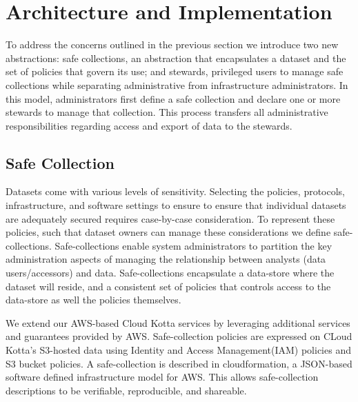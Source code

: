 \section{Architecture and Implementation}
\label{sec:architecture}


To address the concerns outlined in the previous section we introduce two
new abstractions: safe collections, an abstraction that encapsulates
a dataset and the set of policies that govern its use; and stewards, privileged users
to manage safe collections while separating administrative from infrastructure
administrators.  
In this model, administrators first define a safe collection and declare one 
or more stewards to manage that collection. This process transfers
all administrative responsibilities regarding access and export of data to the stewards.

\subsection{Safe Collection}

Datasets come with various levels of sensitivity. Selecting the policies, protocols, infrastructure, and 
software settings to ensure to ensure that individual datasets are adequately secured requires
case-by-case consideration. To represent these policies, such that dataset owners can manage these considerations
we define safe-collections. Safe-collections enable system administrators to partition the key administration
aspects of managing the relationship between analysts (data users/accessors) and data. 
Safe-collections encapsulate a data-store where the dataset will reside, and a consistent set of policies
that controls access to the data-store as well the policies themselves.

We extend our AWS-based Cloud Kotta services by leveraging additional
services and guarantees provided by AWS. 
Safe-collection policies are expressed on CLoud Kotta's S3-hosted data
using Identity and Access Management(IAM) policies and S3 bucket policies.
A safe-collection is described in cloudformation, a JSON-based software defined infrastructure model for AWS.
This allows safe-collection descriptions to be verifiable, reproducible, and shareable.

